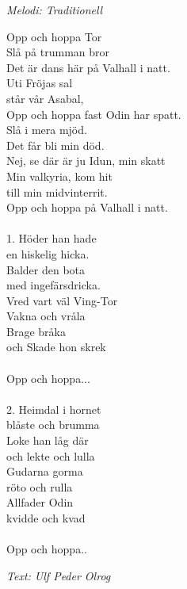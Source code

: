 {\footnotesize\textit{Melodi: Traditionell}}\par
\vspace{10pt}
Opp och hoppa Tor\\
Slå på trumman bror\\
Det är dans här på Valhall i natt.\\
Uti Fröjas sal\\
står vår Asabal,\\
Opp och hoppa fast Odin har spatt.\\
Slå i mera mjöd.\\
Det får bli min död.\\
Nej, se där är ju Idun, min skatt\\
Min valkyria, kom hit\\
till min midvinterrit.\\
Opp och hoppa på Valhall i natt.\\
\\
1. Höder han hade\\
en hiskelig hicka.\\
Balder den bota\\
med ingefärsdricka.\\
Vred vart väl Ving-Tor\\
Vakna och vråla\\
Brage bråka\\
och Skade hon skrek\\
\\
Opp och hoppa...\\
\\
2. Heimdal i hornet\\
blåste och brumma\\
Loke han låg där\\
och lekte och lulla\\
Gudarna gorma\\
röto och rulla\\
Allfader Odin\\
kvidde och kvad\\
\\
Opp och hoppa..
\par
\vspace{10pt}
{\footnotesize\textit{Text: Ulf Peder Olrog}}
